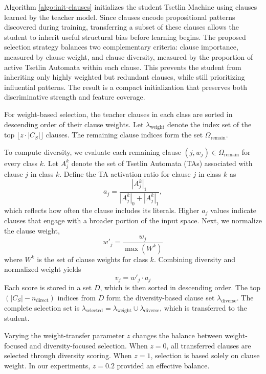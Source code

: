 \documentclass[sn-mathphys-num]{sn-jnl}%
\theoremstyle{thmstyleone}%
\theoremstyle{thmstyletwo}%
\theoremstyle{thmstylethree}%
\begin{document}
Algorithm \ref{algo:init-clauses} initializes the student Tsetlin Machine using clauses learned by the teacher model. Since clauses encode propositional patterns discovered during training, transferring a subset of these clauses allows the student to inherit useful structural bias before learning begins. The proposed selection strategy balances two complementary criteria: clause importance, measured by clause weight, and clause diversity, measured by the proportion of active Tsetlin Automata within each clause. This prevents the student from inheriting only highly weighted but redundant clauses, while still prioritizing influential patterns. The result is a compact initialization that preserves both discriminative strength and feature coverage.

For weight-based selection, the teacher clauses in each class are sorted in descending order of their clause weights. Let $\lambda_{\text{weight}}$ denote the index set of the top $\lfloor z\cdot|C_S|\rfloor$ clauses. The remaining clause indices form the set $\Omega_{\text{remain}}$.

To compute diversity, we evaluate each remaining clause $(j,w_j) \in \Omega_{\text{remain}}$ for every class $k$. Let $A_j^k$ denote the set of Tsetlin Automata (TAs) associated with clause $j$ in class $k$. Define the TA activation ratio for clause $j$ in class $k$ as
\[
a_j = \frac{|A_j^k|_1}{|A_j^k|_0 + |A_j^k|_1},
\]
which reflects how often the clause includes its literals. Higher $a_j$ values indicate clauses that engage with a broader portion of the input space. Next, we normalize the clause weight,
\[
w'_j = \frac{w_j}{\max(W^k)}
\]
where $W^k$ is the set of clause weights for class $k$. Combining diversity and normalized weight yields
\[
v_j = w'_j \cdot a_j
\]
Each score is stored in a set $D$, which is then sorted in descending order. The top $(|C_S| - n_{\text{direct}})$ indices from $D$ form the diversity-based clause set $\lambda_{\text{diverse}}$. The complete selection set is $\lambda_{\text{selected}} = \lambda_{\text{weight}} \cup \lambda_{\text{diverse}}$, which is transferred to the student.

Varying the weight-transfer parameter $z$ changes the balance between weight-focused and diversity-focused selection. When $z=0$, all transferred clauses are selected through diversity scoring. When $z=1$, selection is based solely on clause weight. In our experiments, $z=0.2$ provided an effective balance.
\end{document}
